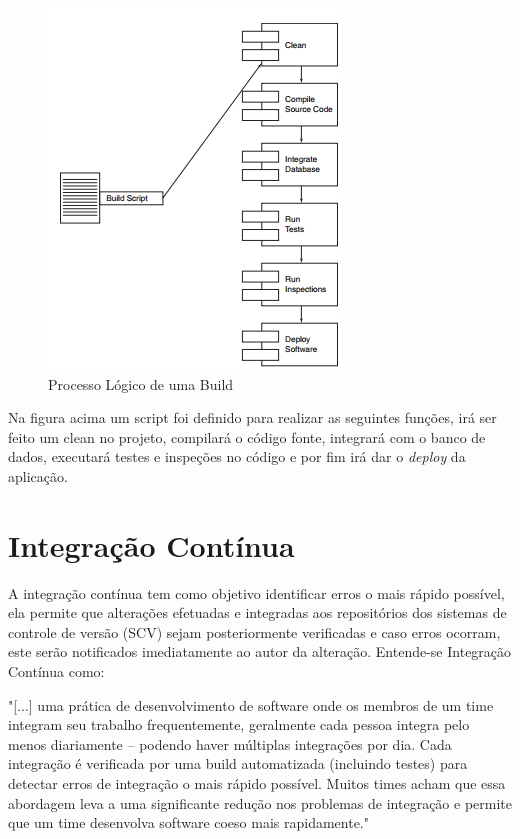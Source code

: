 \begin{figure}[h]
\centering
\includegraphics[width=0.5\linewidth]{./images/build}
\caption[Processo Lógico de uma Build]{Processo Lógico de uma Build}
\label{fig:build}
\end{figure}
Na figura acima um script foi definido para realizar as seguintes funções, irá ser feito um clean no projeto, compilará o código fonte, integrará com o banco de dados, executará testes e inspeções no código e por fim irá dar o \textit{deploy} da aplicação.



\section{Integração Contínua}\label{integracaocont}

A integração contínua tem como objetivo identificar erros o mais rápido possível, ela permite que alterações efetuadas e integradas aos repositórios dos sistemas de controle de versão (SCV) sejam posteriormente verificadas e caso erros ocorram, este serão notificados imediatamente ao autor da alteração.
Entende-se Integração Contínua como:
\begin{citacao}
"[...] uma prática de desenvolvimento de software onde os membros de um time integram seu trabalho frequentemente, geralmente cada pessoa integra pelo menos diariamente – podendo haver múltiplas integrações por dia. Cada integração é verificada por uma build automatizada (incluindo testes) para detectar erros de integração o mais rápido possível. Muitos times acham que essa abordagem leva a uma significante redução nos problemas de integração e permite que um time desenvolva software coeso mais rapidamente." 
\end{citacao}

